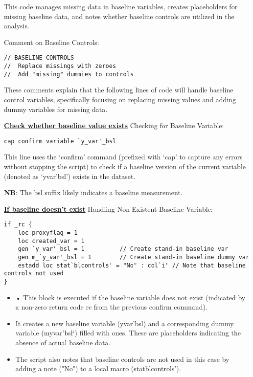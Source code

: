 \documentclass{article}
\begin{document}
This code manages missing data in baseline variables, creates placeholders for missing baseline data, and notes whether baseline controls are utilized in the analysis. \newline

Comment on Baseline Controls:

\begin{mdframed}
\begin{verbatim}
// BASELINE CONTROLS 
// 	Replace missings with zeroes 
// 	Add "missing" dummies to controls
\end{verbatim}
\end{mdframed}

\vspace{0.3cm} These comments explain that the following lines of code will handle baseline control variables, specifically focusing on replacing missing values and adding dummy variables for missing data.

\underline{\textbf{Check whether baseline value exists}}
\vspace{0.3cm} Checking for Baseline Variable:
\begin{mdframed}
\begin{verbatim}
cap confirm variable `y_var'_bsl
\end{verbatim}
\end{mdframed}

\vspace{0.3cm}This line uses the ‘confirm’ command (prefixed with ‘cap’ to capture any errors without stopping the script) to check if a baseline version of the current variable (denoted as ‘yvar'bsl’) exists in the dataset. 

\textbf{NB}: The bsl suffix likely indicates a baseline measurement.

\underline{\textbf{If baseline doesn't exist}}
\vspace{0.3cm}Handling Non-Existent Baseline Variable:
\begin{mdframed}
\begin{verbatim}
if _rc { 
    loc proxyflag = 1 
    loc created_var = 1
    gen `y_var'_bsl = 1          // Create stand-in baseline var
    gen m_`y_var'_bsl = 1        // Create stand-in baseline dummy var
    estadd loc stat`blcontrols' = "No" : col`i' // Note that baseline controls not used
}
\end{verbatim}
\end{mdframed}

\begin{itemize}
    \item •	This block is executed if the baseline variable does not exist (indicated by a non-zero return code rc from the previous confirm command).
    \item It creates a new baseline variable (yvar'bsl) and a corresponding dummy variable (myvar'bsl`) filled with ones. These are placeholders indicating the absence of actual baseline data. 
   \item The script also notes that baseline controls are not used in this case by adding a note ("No") to a local macro (statblcontrols').
\end{itemize}
\end{document}
